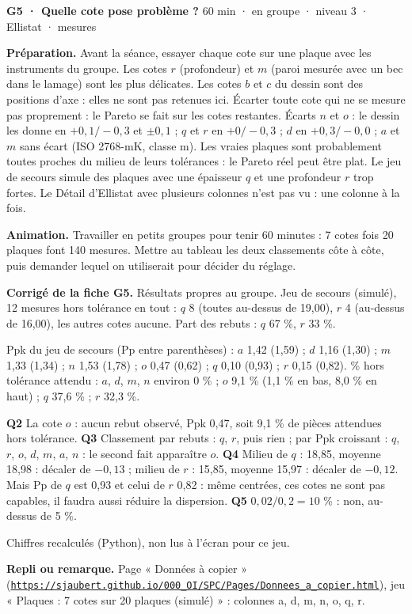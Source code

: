 \vspace{3pt}
\begin{tcolorbox}[act]\textbf{G5 · Quelle cote pose problème ?} \hfill {\small 60 min · en groupe · niveau 3 · Ellistat · mesures}\end{tcolorbox}
\textbf{Préparation.} Avant la séance, essayer chaque cote sur une plaque avec les instruments du groupe. Les cotes $r$ (profondeur) et $m$ (paroi mesurée avec un bec dans le lamage) sont les plus délicates. Les cotes $b$ et $c$ du dessin sont des positions d'axe : elles ne sont pas retenues ici. Écarter toute cote qui ne se mesure pas proprement : le Pareto se fait sur les cotes restantes. Écarts $n$ et $o$ : le dessin les donne en $+0{,}1/-0{,}3$ et $\pm 0{,}1$ ; $q$ et $r$ en $+0/-0{,}3$ ; $d$ en $+0{,}3/-0{,}0$ ; $a$ et $m$ sans écart (ISO 2768-mK, classe m). Les vraies plaques sont probablement toutes proches du milieu de leurs tolérances : le Pareto réel peut être plat. Le jeu de secours simule des plaques avec une épaisseur $q$ et une profondeur $r$ trop fortes. Le Détail d'Ellistat avec plusieurs colonnes n'est pas vu : une colonne à la fois.\par
\textbf{Animation.} Travailler en petits groupes pour tenir 60 minutes : 7 cotes fois 20 plaques font 140 mesures. Mettre au tableau les deux classements côte à côte, puis demander lequel on utiliserait pour décider du réglage.\par
\textbf{\color{ok}Corrigé de la fiche G5.} Résultats propres au groupe. Jeu de secours (simulé), 12 mesures hors tolérance en tout : $q$ 8 (toutes au-dessus de 19,00), $r$ 4 (au-dessus de 16,00), les autres cotes aucune. Part des rebuts : $q$ 67 \%, $r$ 33 \%.\par Ppk du jeu de secours (Pp entre parenthèses) : $a$ 1,42 (1,59) ; $d$ 1,16 (1,30) ; $m$ 1,33 (1,34) ; $n$ 1,53 (1,78) ; $o$ 0,47 (0,62) ; $q$ 0,10 (0,93) ; $r$ 0,15 (0,82). \% hors tolérance attendu : $a$, $d$, $m$, $n$ environ 0 \% ; $o$ 9,1 \% (1,1 \% en bas, 8,0 \% en haut) ; $q$ 37,6 \% ; $r$ 32,3 \%.\par \textbf{Q2} La cote $o$ : aucun rebut observé, Ppk 0,47, soit 9,1 \% de pièces attendues hors tolérance. \textbf{Q3} Classement par rebuts : $q$, $r$, puis rien ; par Ppk croissant : $q$, $r$, $o$, $d$, $m$, $a$, $n$ : le second fait apparaître $o$. \textbf{Q4} Milieu de $q$ : 18,85, moyenne 18,98 : décaler de $-0{,}13$ ; milieu de $r$ : 15,85, moyenne 15,97 : décaler de $-0{,}12$. Mais Pp de $q$ est 0,93 et celui de $r$ 0,82 : même centrées, ces cotes ne sont pas capables, il faudra aussi réduire la dispersion. \textbf{Q5} $0{,}02 / 0{,}2 = 10$ \% : non, au-dessus de 5 \%.\par Chiffres recalculés (Python), non lus à l'écran pour ce jeu.\par
{\small\textbf{Repli ou remarque.} Page « Données à copier » (\href{https://sjaubert.github.io/000_OI/SPC/Pages/Donnees_a_copier.html}{\nolinkurl{https://sjaubert.github.io/000_OI/SPC/Pages/Donnees_a_copier.html}}), jeu « Plaques : 7 cotes sur 20 plaques (simulé) » : colonnes a, d, m, n, o, q, r.}\par
\vspace{3pt}